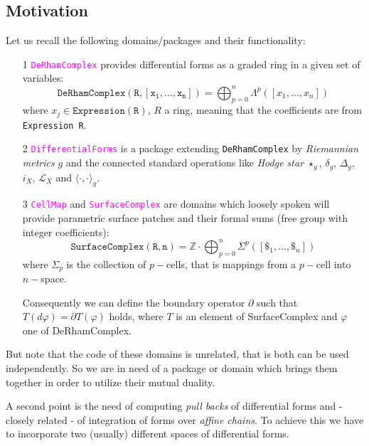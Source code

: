 \documentclass[12pt,a4paper]{article}
\newcommand{\spadfun}[1]{\textcolor{magenta}{\tt #1}}
\begin{document}
\subsection{Motivation}
Let us recall the following domains/packages and their functionality:
\begin{itemize}
\item[1] \spadfun{DeRhamComplex} provides differential forms as a
graded ring in a given set of variables:
\begin{displaymath}
  \mathtt{DeRhamComplex(R,[x_1,\ldots,x_n])} =
      \bigoplus_{p=0}^n \Lambda^p([x_1,\ldots,x_n])
\end{displaymath}
where $x_j\in \mathtt{Expression(R)}$, $R$ a ring, meaning that the
coefficients are from {\tt Expression R}.
%
\item[2] \spadfun{DifferentialForms} is a package extending 
{\tt DeRhamComplex} by {\em Riemannian metrics} $g$ and
the connected standard operations like {\em Hodge star} $\star_g$,
$\delta_g$, $\Delta_g$, $i_X$, $\mathcal{L}_X$ and 
$\langle\cdot,\cdot\rangle_g$.
%
\item[3] \spadfun{CellMap} and \spadfun{SurfaceComplex} are domains
which loosely spoken will provide parametric surface patches and
their formal sums (free group with integer coefficients):
\begin{displaymath}
  \mathtt{SurfaceComplex(R,n)} =
      \mathbb{Z}\cdot\bigoplus_{p=0}^n \Sigma^p([\$_1,\ldots,\$_n])  
\end{displaymath}
where $\Sigma_p$ is the collection of $p-$cells, that is mappings
from a $p-$cell into $n-$space.

Consequently we can define the boundary operator $\partial$ such 
that $T(d\varphi)=\partial T(\varphi)$ holds, where $T$ is an
element of SurfaceComplex and $\varphi$ one of DeRhamComplex.
\end{itemize}
But note that the code of these domains is unrelated, that is
both can be used independently. So we are in need of a package
or domain which brings them together in order to utilize their 
mutual duality.

A second point is the need of computing {\em pull backs} of
differential forms and - closely related - of integration of
forms over {\em affine chains}. To achieve this we have
to incorporate two (usually) different spaces of differential
forms.
\end{document}
